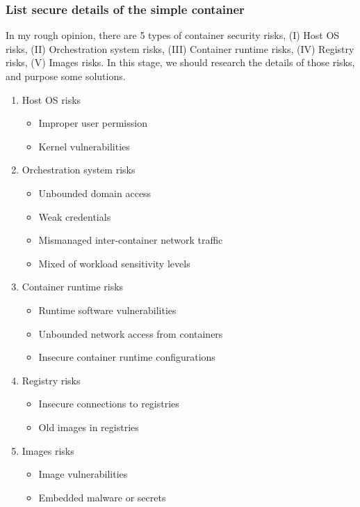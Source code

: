 \documentclass[12pt,a4paper]{article}
\begin{document}
\subsubsection{List secure details of the simple container}
In my rough opinion, there are 5 types of container security risks, (\RN{1}) Host OS risks, (\RN{2})
Orchestration system risks, (\RN{3}) Container runtime risks, (\RN{4}) Registry risks, (\RN{5})
Images risks. In this stage, we should research the details of those risks, and purpose some solutions.
\\
\begin{enumerate}[I]
  \item{Host OS risks}
        \begin{itemize}
          \item Improper user permission
          \item Kernel vulnerabilities
        \end{itemize}
  \item{Orchestration system risks}
        \begin{itemize}
          \item Unbounded domain access
          \item Weak credentials
          \item Mismanaged inter-container network traffic
          \item Mixed of workload sensitivity levels
        \end{itemize}
  \item{Container runtime risks}
        \begin{itemize}
          \item Runtime software vulnerabilities
          \item Unbounded network access from containers
          \item Insecure container runtime configurations
        \end{itemize}
  \item{Registry risks}
        \begin{itemize}
          \item Insecure connections to registries
          \item Old images in registries
        \end{itemize}
  \item{Images risks}
        \begin{itemize}
          \item Image vulnerabilities
          \item Embedded malware or secrets
        \end{itemize}
\end{enumerate}
\end{document}
